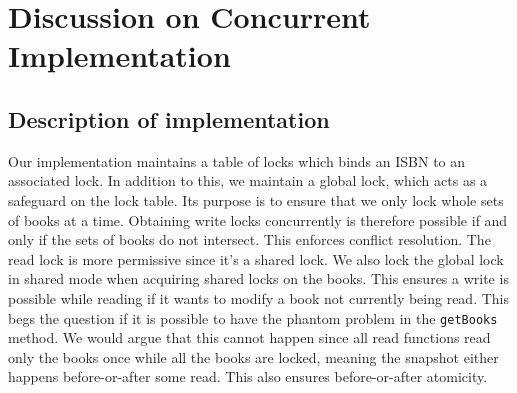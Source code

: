 
\section{Discussion on Concurrent Implementation}

\subsection{Description of implementation}
Our implementation maintains a table of locks which binds an ISBN to an
associated lock. In addition to this, we maintain a global lock, which acts as
a safeguard on the lock table. Its purpose is to ensure that we only lock whole
sets of books at a time. Obtaining write locks concurrently is therefore possible
if and only if the sets of books do not intersect. This enforces conflict
resolution. The read lock is more permissive since it's a shared lock. We also lock the global lock in shared mode when acquiring shared locks on the books. This ensures a write is possible while reading if it wants to modify a book not currently being read. This begs the question if it is possible to have the phantom problem in the {\tt getBooks} method. We would argue that this cannot happen since all read functions read only the books once while all the books are locked, meaning the snapshot either happens before-or-after some read. This also ensures before-or-after atomicity.

